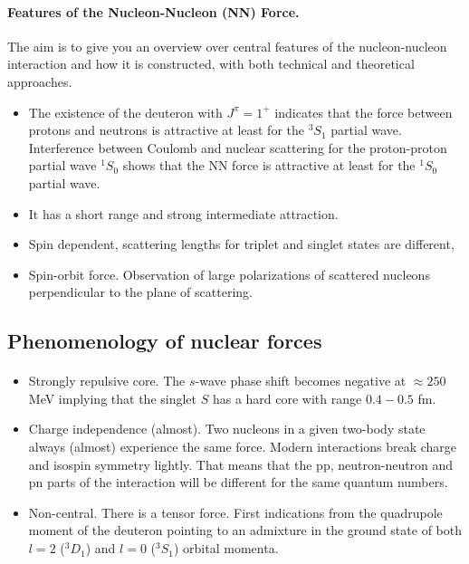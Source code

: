 \documentclass[%
twoside,                 %
final,                   %
10pt]{article}
\begin{document}
\paragraph{Features of the Nucleon-Nucleon (NN) Force.}

The aim is to give you an overview over central features of the nucleon-nucleon interaction and how it is constructed, with both technical and theoretical approaches. 

\begin{itemize}
\item The existence of the deuteron with $J^{\pi}=1^+$ indicates that the force between protons and neutrons is attractive at least for the $^3S_1$ partial wave. Interference between Coulomb and nuclear scattering for the proton-proton partial wave $^1S_0$ shows that  the NN force is attractive at least for the $^1S_0$ partial wave. 

\item It has a short range and strong intermediate attraction.

\item Spin dependent, scattering lengths for triplet and singlet states are different,

\item Spin-orbit force. Observation of large polarizations of scattered nucleons perpendicular to the plane of scattering.
\end{itemize}

\noindent



\subsection*{Phenomenology of nuclear forces}

\paragraph{}

\begin{itemize}
\item Strongly repulsive core. The $s$-wave phase shift becomes negative at $\approx 250$ MeV implying that the singlet $S$ has a hard core with range $0.4-0.5$ fm. 

\item Charge independence (almost). Two nucleons in a given two-body state always (almost) experience the same force. Modern interactions break charge and isospin symmetry lightly. That means that the pp, neutron-neutron and pn parts of the interaction will be different for the same quantum numbers. 

\item Non-central. There is a tensor force. First indications from the quadrupole moment of the deuteron pointing to an admixture in the ground state of both $l=2$ ($^3D_1$) and $l=0$ ($^3S_1$) orbital momenta.
\end{itemize}
\end{document}
